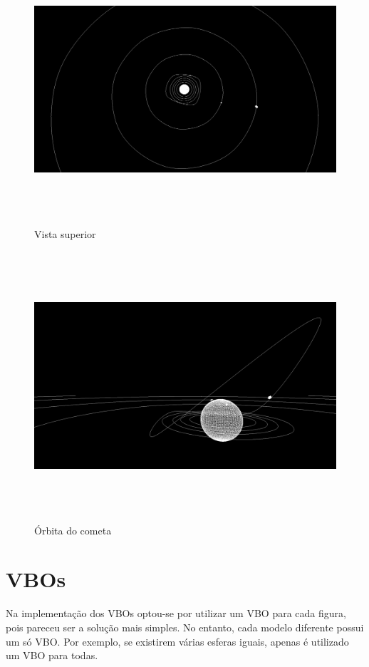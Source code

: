 \documentclass[11pt,a4paper]{report}
\begin{document}
\begin{figure}[H]
\centering
\includegraphics[width = 18cm,height = 10cm]{ss3.png}
\caption{Vista superior}
\label{fig:demo3}
\end{figure}

\begin{figure}[H]
\centering
\includegraphics[width = 18cm,height = 10cm]{ss4.png}
\caption{Órbita do cometa}
\label{fig:demo4}
\end{figure}




\section{VBOs}
Na implementação dos VBOs optou-se por utilizar um VBO para cada figura, pois pareceu ser a solução mais simples. No entanto, cada modelo diferente possui um só VBO. Por exemplo, se existirem várias esferas iguais, apenas é utilizado um VBO para todas.
\end{document}
